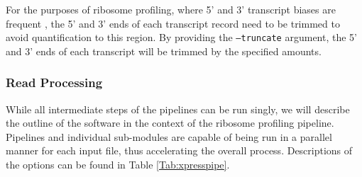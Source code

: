 \documentclass[11pt, a4paper, oneside]{article}
\begin{document}
For the purposes of ribosome profiling, where 5' and 3' transcript biases are frequent \cite{ingolia_meth, weinberg_reports}, the 5' and 3' ends of each transcript record need to be trimmed to avoid quantification to this region. By providing the \texttt{--truncate} argument, the 5' and 3' ends of each transcript will be trimmed by the specified amounts.

\subsubsection{Read Processing}
While all intermediate steps of the pipelines can be run singly, we will describe the outline of the software in the context of the ribosome profiling pipeline. Pipelines and individual sub-modules are capable of being run in a parallel manner for each input file, thus accelerating the overall process. Descriptions of the options can be found in Table \ref{Tab:xpresspipe}.
\end{document}

